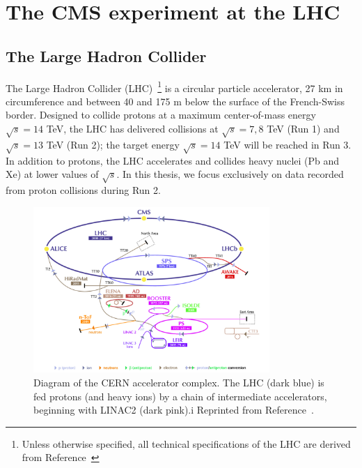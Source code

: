 \chapter{The CMS experiment at the LHC}
\label{sec:cms}

\section{The Large Hadron Collider}

The Large Hadron Collider (LHC)~\cite{lhcjinst}\footnote{Unless otherwise specified, all technical specifications of the LHC are derived from Reference~\cite{lhcjinst}} is a circular particle accelerator, 27 km in circumference and between 40 and 175 m below the surface of the French-Swiss border. 
Designed to collide protons at a maximum center-of-mass energy $\sqrt{s} = 14$ TeV, the LHC has delivered collisions at $\sqrt{s}=7,8$ TeV (Run 1) and $\sqrt{s} = 13$ TeV (Run 2); the target energy $\sqrt{s} = 14$ TeV will be reached in Run 3. 
In addition to protons, the LHC accelerates and collides heavy nuclei (Pb and Xe) at lower values of $\sqrt{s}$. 
In this thesis, we focus exclusively on data recorded from proton collisions during Run 2. 

\begin{figure}[]
    \begin{center}
        \includegraphics[width=0.8\textwidth]{figures/cms/lhc.png}
        \caption{Diagram of the CERN accelerator complex.
                 The LHC (dark blue) is fed protons (and heavy ions) by a chain of intermediate accelerators, beginning with LINAC2 (dark pink).i
                 Reprinted from Reference~\cite{lhcpic}. 
                    }
        \label{fig:cms:lhc}
    \end{center}
\end{figure}

